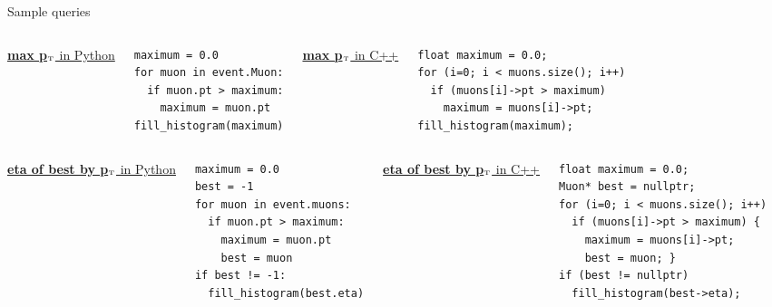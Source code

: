 \documentclass{beamer}
\begin{document}
\begin{frame}[fragile]{Sample queries}
\vspace{0.5 cm}
\scriptsize

\begin{columns}
\underline{{\bf max p$_{\mbox{\tiny T}}$} in Python}
\begin{verbatim}
maximum = 0.0
for muon in event.Muon:
  if muon.pt > maximum:
    maximum = muon.pt
fill_histogram(maximum)
\end{verbatim}
\underline{{\bf max p$_{\mbox{\tiny T}}$} in C++}
\begin{verbatim}
float maximum = 0.0;
for (i=0; i < muons.size(); i++)
  if (muons[i]->pt > maximum)
    maximum = muons[i]->pt;
fill_histogram(maximum);
\end{verbatim}
\end{columns}

\vfill
\begin{columns}
\underline{{\bf eta of best by p$_{\mbox{\tiny T}}$} in Python}
\begin{verbatim}
maximum = 0.0
best = -1
for muon in event.muons:
  if muon.pt > maximum:
    maximum = muon.pt
    best = muon
if best != -1:
  fill_histogram(best.eta)
\end{verbatim}
\underline{{\bf eta of best by p$_{\mbox{\tiny T}}$} in C++}
\begin{verbatim}
float maximum = 0.0;
Muon* best = nullptr;
for (i=0; i < muons.size(); i++)
  if (muons[i]->pt > maximum) {
    maximum = muons[i]->pt;
    best = muon; }
if (best != nullptr)
  fill_histogram(best->eta);
\end{verbatim}
\end{columns}
\end{frame}
\end{document}
